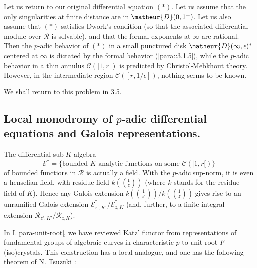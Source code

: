 \begin{para}\label{para::3.2.9} Let us return to our original differential
 equation $(\ast)$. Let us assume that the only singularities at finite
 distance are in $\matheur{D}(0,1^+)$.  Let us 
 also assume that $(\ast)$ satisfies Dwork's condition (so that the
 associated differential module over $\mathcal{R}$ is solvable), and that
 the formal exponents at $\infty$ are rational. Then the $p$-adic
 behavior of $(\ast)$ in a small punctured disk $\matheur{D}(\infty,
 \epsilon)^\ast$ centered at $\infty$ is dictated by the formal behavior
 (\cf \ref{para::3.1.5}), while the $p$-adic behavior in a thin annulus
 $\mathcal{C}(]1,r[)$ is predicted by Christol-Mebkhout theory. However,
 in the intermediate region $\mathcal{C}([r,1/\epsilon])$, nothing seems
 to be known.

 We shall return to this problem in 3.5. 
\end{para}

\subsection{Local monodromy of $p$-adic differential equations and
  Galois representations.}\label{sub::3.3}

\begin{para}\label{para::3.3.1} The differential sub-$K$-algebra 
 \begin{equation*}
  \mathcal{E}^{\dag} = \{\text{bounded $K$-analytic functions on some }
   \mathcal{C}(]1,r[)\}
 \end{equation*} 
 of bounded functions in $\mathcal{R}$ is actually a field. With the
 $p$-adic sup-norm, it is even a henselian field, with residue field
 $k((\frac{1}{z}))$ (where $k$ stands for the residue field of $K$).
 Hence any Galois extension $k((\frac{1}{z'}))/k((\frac{1}{z}))$ gives
 rise to an unramified Galois extension
 $\mathcal{E}^\dagger_{z',K'}/\mathcal{E}^\dagger_{z,K}$ (and, further,
 to a finite integral extension
 $\mathcal{R}_{z',K'}/\mathcal{R}_{z,K}$).
\end{para}

\begin{para}\label{para::3.3.2} In I.\ref{para-unit-root}, we have
 reviewed Katz' functor 
 from representations of fundamental groups of algebraic curves in
 characteristic $p$ to unit-root $F$-(iso)crystals. This construction has
 a local analogue, and one has the following theorem of N. Tsuzuki 
 \cite{tsuzuki98:_finit_f}:
\end{para}

